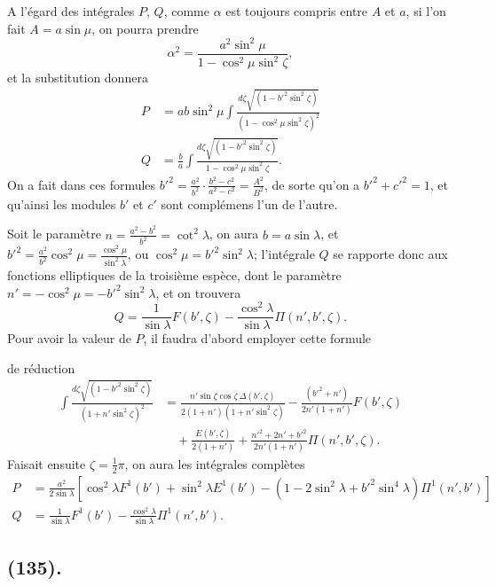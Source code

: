 \documentclass{article}
\begin{document}
A l'égard des intégrales $P$, $Q$, comme $\alpha$ est toujours compris entre $A$ et $a$, si l'on fait $A=a\sin\mu$, on pourra prendre
\[ \alpha^{2}=\frac{a^{2}\sin^{2}\mu}{1-\cos^{2}\mu\sin^{2}\zeta}, \]
et la substitution donnera
\[ \begin{aligned} P&=ab\sin^{2}\mu\int\frac{d\zeta\sqrt{(1-b'^{2}\sin^{2}\zeta)}}{(1-\cos^{2}\mu\sin^{2}\zeta)^{2}}\\ Q&=\frac{b}{a}\int\frac{d\zeta\sqrt{(1-b'^{2}\sin^{2}\zeta)}}{1-\cos^{2}\mu\sin^{2}\zeta}. \end{aligned} \]
On a fait dans ces formules $b'^{2}=\frac{a^{2}}{b^{2}}\cdot\frac{b^{2}-c^{2}}{a^{2}-c^{2}}=\frac{A^{2}}{B^{2}}$, de sorte qu'on a $b'^{2}+c'^{2}=1$, et qu'ainsi les modules $b'$ et $c'$ sont complémens l'un de l'autre.

Soit le paramètre $n=\frac{a^{2}-b^{2}}{b^{2}}=\cot^{2}\lambda$, on aura $b=a\sin\lambda$, et $b'^{2}=\frac{a^{2}}{b^{2}}\cos^{2}\mu=\frac{\cos^{2}\mu}{\sin^{2}\lambda}$, ou $\cos^{2}\mu=b'^{2}\sin^{2}\lambda$; l'intégrale $Q$ se rapporte donc aux fonctions elliptiques de la troisième espèce, dont le paramètre $n'=-\cos^{2}\mu=-b'^{2}\sin^{2}\lambda$, et on trouvera
\[ Q=\frac{1}{\sin\lambda}F(b',\zeta)-\frac{\cos^{2}\lambda}{\sin\lambda}\Pi(n',b',\zeta). \]
Pour avoir la valeur de $P$, il faudra d'abord employer cette formule

de réduction
\[ \begin{aligned} \int\frac{d\zeta\sqrt{(1-b'^{2}\sin^{2}\zeta)}}{(1+n'\sin^{2}\zeta)^{2}}&=\frac{n'\sin\zeta\cos\zeta\,\Delta(b',\zeta)}{2(1+n')(1+n'\sin^{2}\zeta)}-\frac{(b'^{2}+n')}{2n'(1+n')}F(b',\zeta)\\ &\quad+\frac{E(b',\zeta)}{2(1+n')}+\frac{n'^{2}+2n'+b'^{2}}{2n'(1+n')}\Pi(n',b',\zeta). \end{aligned} \]
Faisait ensuite $\zeta=\frac{1}{2}\pi$, on aura les intégrales complètes
\[ \begin{aligned} P&=\frac{a^{2}}{2\sin\lambda}[\cos^{2}\lambda F^{1}(b')+\sin^{2}\lambda E^{1}(b')-(1-2\sin^{2}\lambda+b'^{2}\sin^{4}\lambda)\Pi^{1}(n',b')]\\ Q&=\frac{1}{\sin\lambda}F^{1}(b')-\frac{\cos^{2}\lambda}{\sin\lambda}\Pi^{1}(n',b'). \end{aligned} \]

\subsection*{(135).}
\end{document}
